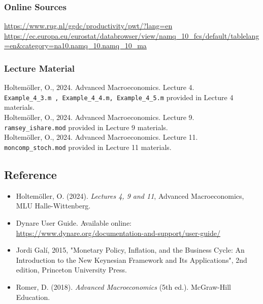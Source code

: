\documentclass[12pt,a4paper,notitlepage]{article}
\numberwithin{equation}{section}
\begin{document}
\begin{itemize}
\begin{itemize}
\subsubsection*{Online Sources}
\url{https://www.rug.nl/ggdc/productivity/pwt/?lang=en} \\
\url{https://ec.europa.eu/eurostat/databrowser/view/namq_10_fcs/default/tablelang=en&category=na10.namq_10.namq_10_ma}   \\

\subsubsection*{Lecture Material}


Holtemöller, O., 2024. Advanced Macroeconomics. Lecture 4. \\
\texttt{Example\_4\_3.m , Example\_4\_4.m, Example\_4\_5.m} provided in Lecture 4 materials. \\
Holtemöller, O., 2024. Advanced Macroeconomics. Lecture 9. \\
\texttt{ramsey\_ishare.mod} provided in Lecture 9 materials.\\
Holtemöller, O., 2024. Advanced Macroeconomics. Lecture 11.\\
\texttt{moncomp\_stoch.mod} provided in Lecture 11 materials. \\

 
\subsection*{Reference}
\begin{itemize}
  \item Holtemöller, O. (2024). \textit{Lectures 4, 9 and 11}, Advanced Macroeconomics, MLU Halle-Wittenberg.
   \item Dynare User Guide. Available online: \\ \url{https://www.dynare.org/documentation-and-support/user-guide/}
\end{itemize}

\begin{itemize}
  \item {Jordi Galí, 2015, "Monetary Policy, Inflation, and the Business Cycle: An Introduction to the New Keynesian Framework and Its Applications", 2nd edition, Princeton University Press. } \end{itemize}
  
\begin{itemize}
  \item{Romer, D. (2018). \textit{Advanced Macroeconomics} (5th ed.). McGraw-Hill Education.}
\end{itemize}


\end{itemize}
\end{itemize}
\end{document}
